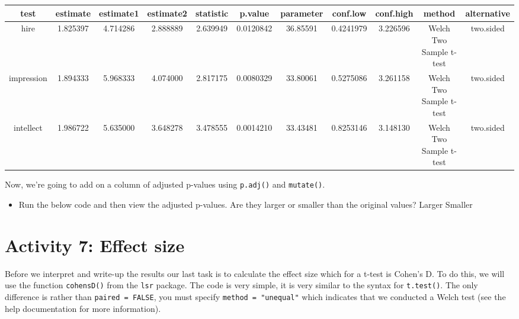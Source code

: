 \documentclass[]{book}
\newenvironment{Shaded}{\begin{snugshade}}{\end{snugshade}}
\newcommand{\CommentTok}[1]{\textcolor[rgb]{0.56,0.35,0.01}{\textit{#1}}}
\newcommand{\DataTypeTok}[1]{\textcolor[rgb]{0.13,0.29,0.53}{#1}}
\newcommand{\KeywordTok}[1]{\textcolor[rgb]{0.13,0.29,0.53}{\textbf{#1}}}
\newcommand{\NormalTok}[1]{#1}
\newcommand{\OperatorTok}[1]{\textcolor[rgb]{0.81,0.36,0.00}{\textbf{#1}}}
\newcommand{\StringTok}[1]{\textcolor[rgb]{0.31,0.60,0.02}{#1}}
\providecommand{\tightlist}{%
  \setlength{\itemsep}{0pt}\setlength{\parskip}{0pt}}
\begin{document}
\begin{tabular}{c|c|c|c|c|c|c|c|c|c|c}
\hline
test & estimate & estimate1 & estimate2 & statistic & p.value & parameter & conf.low & conf.high & method & alternative\\
\hline
hire & 1.825397 & 4.714286 & 2.888889 & 2.639949 & 0.0120842 & 36.85591 & 0.4241979 & 3.226596 & Welch Two Sample t-test & two.sided\\
\hline
impression & 1.894333 & 5.968333 & 4.074000 & 2.817175 & 0.0080329 & 33.80061 & 0.5275086 & 3.261158 & Welch Two Sample t-test & two.sided\\
\hline
intellect & 1.986722 & 5.635000 & 3.648278 & 3.478555 & 0.0014210 & 33.43481 & 0.8253146 & 3.148130 & Welch Two Sample t-test & two.sided\\
\hline
\end{tabular}

Now, we're going to add on a column of adjusted p-values using \texttt{p.adj()} and \texttt{mutate()}.

\begin{itemize}
\tightlist
\item
  Run the below code and then view the adjusted p-values. Are they larger or smaller than the original values? Larger Smaller
\end{itemize}

\begin{Shaded}
\end{Shaded}

\hypertarget{activity-7-effect-size}{%
\section{Activity 7: Effect size}\label{activity-7-effect-size}}

Before we interpret and write-up the results our last task is to calculate the effect size which for a t-test is Cohen's D. To do this, we will use the function \texttt{cohensD()} from the \texttt{lsr} package. The code is very simple, it is very similar to the syntax for \texttt{t.test()}. The only difference is rather than \texttt{paired\ =\ FALSE}, you must specify \texttt{method\ =\ "unequal"} which indicates that we conducted a Welch test (see the help documentation for more information).
\end{document}
